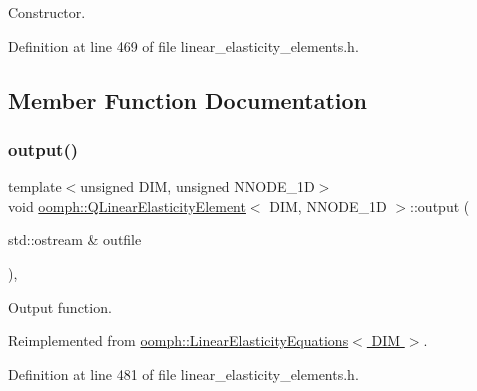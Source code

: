 Constructor. 



Definition at line 469 of file linear\+\_\+elasticity\+\_\+elements.\+h.



\subsection{Member Function Documentation}
\mbox{\label{classoomph_1_1QLinearElasticityElement_ab5746a722f2c015ceaace3afce89d797}} 
\subsubsection{\texorpdfstring{output()}{output()}\hspace{0.1cm}{\footnotesize\ttfamily [1/4]}}
{\footnotesize\ttfamily template$<$unsigned D\+IM, unsigned N\+N\+O\+D\+E\+\_\+1D$>$ \\
void \hyperlink{classoomph_1_1QLinearElasticityElement}{oomph\+::\+Q\+Linear\+Elasticity\+Element}$<$ D\+IM, N\+N\+O\+D\+E\+\_\+1D $>$\+::output (\begin{DoxyParamCaption}\item[{std\+::ostream \&}]{outfile }\end{DoxyParamCaption})\hspace{0.3cm}{\ttfamily [inline]}, {\ttfamily [virtual]}}



Output function. 



Reimplemented from \hyperlink{classoomph_1_1LinearElasticityEquations_a43d6b5b646f798329c1d77f64d26cdeb}{oomph\+::\+Linear\+Elasticity\+Equations$<$ D\+I\+M $>$}.



Definition at line 481 of file linear\+\_\+elasticity\+\_\+elements.\+h.

\mbox{\label{classoomph_1_1QLinearElasticityElement_a60eeaa0b23deb65a39b2d5bd41540963}} 
